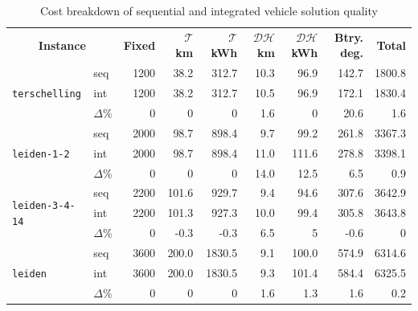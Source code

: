 \documentclass[]{article}
\begin{document}
\begin{table}[h]
  \centering
  \begin{tabular}{llrrrrrrr}
    \toprule
    \multicolumn{2}{c}{\textbf{Instance}} & \textbf{Fixed} & \textbf{$\mathcal{T}$ km} & \textbf{$\mathcal{T}$ kWh} & \textbf{$\mathcal{DH}$ km} & \textbf{$\mathcal{DH}$ kWh} & \textbf{Btry. deg.} & \textbf{Total}\\
    \cmidrule(lr){1-2} \cmidrule(lr){3-9}
    \multirow{3}{*}{\texttt{terschelling}}  & seq        & 1200 & 38.2	& 312.7 &	10.3  & 96.9  &	142.7 & 1800.8 \\
                                            & int        & 1200 &	38.2  & 312.7 & 10.5  &	96.9  & 172.1 & 1830.4 \\ 
                                            & $\Delta\%$ & 0	  & 0	    & 0     &	1.6   & 0     & 20.6  & 1.6    \\
    \multirow{3}{*}{\texttt{leiden-1-2}}    & seq        & 2000 & 98.7  &	898.4 &	9.7   & 99.2  &	261.8 & 3367.3 \\
                                            & int        & 2000	& 98.7	& 898.4 &	11.0	& 111.6 &	278.8 & 3398.1 \\ 
                                            & $\Delta\%$ & 0    &	0     &	0	    & 14.0	& 12.5	& 6.5   & 0.9    \\
    \multirow{3}{*}{\texttt{leiden-3-4-14}} & seq        & 2200	& 101.6 &	929.7 &	9.4   &	94.6  &	307.6 & 3642.9 \\
                                            & int        & 2200	& 101.3 &	927.3 &	10.0  &	99.4  &	305.8 & 3643.8 \\ 
                                            & $\Delta\%$ & 0	  & -0.3  &	-0.3  & 6.5   &	5     &	-0.6  & 0    \\
    \multirow{3}{*}{\texttt{leiden}}        & seq        & 3600	& 200.0 &	1830.5&	9.1   &	100.0 &	574.9 & 6314.6 \\
                                            & int        & 3600	& 200.0 &	1830.5&	9.3   &	101.4 &	584.4 & 6325.5 \\ 
                                            & $\Delta\%$ & 0	  & 0     &	0	    & 1.6	  & 1.3	  & 1.6   & 0.2   \\
    \bottomrule
  \end{tabular}
  \caption{Cost breakdown of sequential and integrated vehicle solution quality}
  \label{tab:seq-vs-int-breakdown-vehicle}
\end{table}
\end{document}

